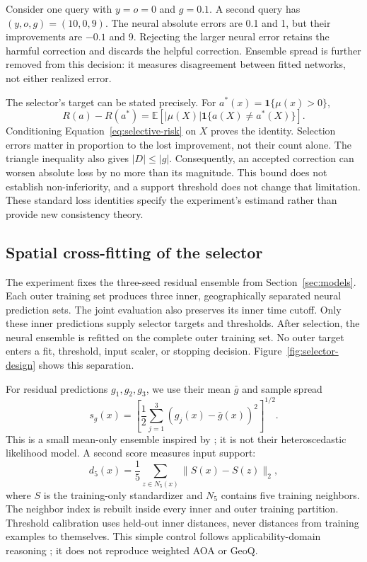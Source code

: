 \documentclass[10pt,letterpaper]{article}
\newcommand{\E}{\mathbb{E}}
\begin{document}
Consider one query with $y=o=0$ and $g=0.1$.
A second query has $(y,o,g)=(10,0,9)$.
The neural absolute errors are 0.1 and 1, but their improvements are $-0.1$ and 9.
Rejecting the larger neural error retains the harmful correction and discards the helpful correction.
Ensemble spread is further removed from this decision: it measures disagreement between fitted networks, not either realized error.

The selector's target can be stated precisely.
For $a^*(x)=\mathbf{1}\{\mu(x)>0\}$,
\begin{equation}\label{eq:selector-regret}
 R(a)-R(a^*)=\E[|\mu(X)|\mathbf{1}\{a(X)\ne a^*(X)\}].
\end{equation}
Conditioning Equation~\ref{eq:selective-risk} on $X$ proves the identity.
Selection errors matter in proportion to the lost improvement, not their count alone.
The triangle inequality also gives $|D|\le |g|$.
Consequently, an accepted correction can worsen absolute loss by no more than its magnitude.
This bound does not establish non-inferiority, and a support threshold does not change that limitation.
These standard loss identities specify the experiment's estimand rather than provide new consistency theory.

\subsection{Spatial cross-fitting of the selector}
The experiment fixes the three-seed residual ensemble from Section~\ref{sec:models}.
Each outer training set produces three inner, geographically separated neural prediction sets.
The joint evaluation also preserves its inner time cutoff.
Only these inner predictions supply selector targets and thresholds.
After selection, the neural ensemble is refitted on the complete outer training set.
No outer target enters a fit, threshold, input scaler, or stopping decision.
Figure~\ref{fig:selector-design} shows this separation.

For residual predictions $g_1,g_2,g_3$, we use their mean $\bar g$ and sample spread
\begin{equation}
 s_g(x)=\left[\frac{1}{2}\sum_{j=1}^{3}(g_j(x)-\bar g(x))^2\right]^{1/2}.
\end{equation}
This is a small mean-only ensemble inspired by \citet{laksh2016}; it is not their heteroscedastic likelihood model.
A second score measures input support:
\begin{equation}
 d_5(x)=\frac{1}{5}\sum_{z\in N_5(x)}\|S(x)-S(z)\|_2,
\end{equation}
where $S$ is the training-only standardizer and $N_5$ contains five training neighbors.
The neighbor index is rebuilt inside every inner and outer training partition.
Threshold calibration uses held-out inner distances, never distances from training examples to themselves.
This simple control follows applicability-domain reasoning \citep{meyer2020}; it does not reproduce weighted AOA or GeoQ.
\end{document}
